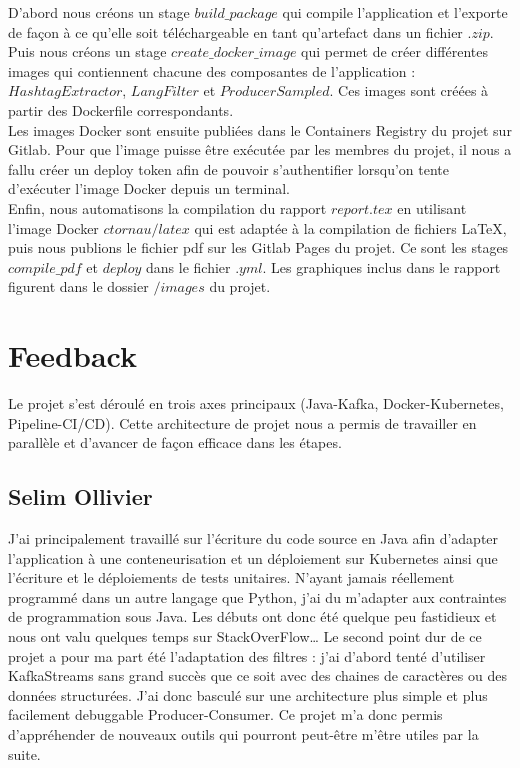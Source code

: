 \documentclass{article}
\begin{document}
D'abord nous créons un stage $build\_package$ qui compile l'application et l'exporte de façon à ce qu'elle soit téléchargeable en tant qu'artefact dans un fichier $.zip$. Puis nous créons un stage $create\_docker\_image$ qui permet de créer différentes images qui contiennent chacune des composantes de l'application : $HashtagExtractor$, $LangFilter$ et $ProducerSampled$. Ces images sont créées à partir des Dockerfile correspondants. \\

 Les images Docker sont ensuite publiées dans le Containers Registry du projet sur Gitlab. Pour que l'image puisse être exécutée par les membres du projet, il nous a fallu créer un deploy token afin de pouvoir s'authentifier lorsqu'on tente d'exécuter l'image Docker depuis un terminal. \\

Enfin, nous automatisons la compilation du rapport $report.tex$ en utilisant l'image Docker $ctornau/latex$ qui est adaptée à la compilation de fichiers \LaTeX, puis nous publions le fichier pdf sur les Gitlab Pages du projet. Ce sont les stages $compile\_pdf$ et $deploy$ dans le fichier $.yml$. Les graphiques inclus dans le rapport figurent dans le dossier $/images$ du projet. \\

\section{Feedback}
Le projet s'est déroulé en trois axes principaux (Java-Kafka, Docker-Kubernetes, Pipeline-CI/CD). Cette architecture de projet nous a permis de travailler en parallèle et d'avancer de façon efficace dans les étapes. 

\subsection{Selim Ollivier}
J'ai principalement travaillé sur l'écriture du code source en Java afin d'adapter l'application à une conteneurisation et un déploiement sur Kubernetes ainsi que l'écriture et le déploiements de tests unitaires. 
N'ayant jamais réellement programmé dans un autre langage que Python, j'ai du m'adapter aux contraintes de programmation sous Java. Les débuts ont donc été quelque peu fastidieux et nous ont valu quelques temps sur StackOverFlow\dots 
Le second point dur de ce projet a pour ma part été l'adaptation des filtres : j'ai d'abord tenté d'utiliser KafkaStreams sans grand succès que ce soit avec des chaines de caractères ou des données structurées. J'ai donc basculé sur une architecture plus simple et plus facilement debuggable Producer-Consumer.
Ce projet m'a donc permis d'appréhender de nouveaux outils qui pourront peut-être m'être utiles par la suite.
\end{document}
